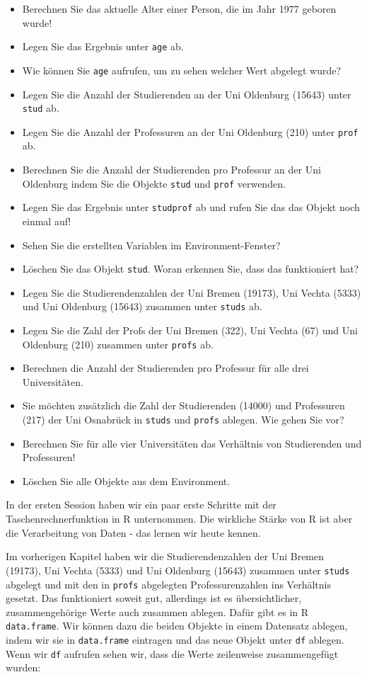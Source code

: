 \documentclass[
  letterpaper,
  DIV=11,
  numbers=noendperiod]{scrreprt}
\begin{document}
\begin{itemize}
\item
  Berechnen Sie das aktuelle Alter einer Person, die im Jahr 1977
  geboren wurde!
\item
  Legen Sie das Ergebnis unter \texttt{age} ab.
\item
  Wie können Sie \texttt{age} aufrufen, um zu sehen welcher Wert
  abgelegt wurde?
\item
  Legen Sie die Anzahl der Studierenden an der Uni Oldenburg (15643)
  unter \texttt{stud} ab.
\item
  Legen Sie die Anzahl der Professuren an der Uni Oldenburg (210) unter
  \texttt{prof} ab.
\item
  Berechnen Sie die Anzahl der Studierenden pro Professur an der Uni
  Oldenburg indem Sie die Objekte \texttt{stud} und \texttt{prof}
  verwenden.
\item
  Legen Sie das Ergebnis unter \texttt{studprof} ab und rufen Sie das
  das Objekt noch einmal auf!
\item
  Sehen Sie die erstellten Variablen im Environment-Fenster?
\item
  Löschen Sie das Objekt \texttt{stud}. Woran erkennen Sie, dass das
  funktioniert hat?
\item
  Legen Sie die Studierendenzahlen der Uni Bremen (19173), Uni Vechta
  (5333) und Uni Oldenburg (15643) zusammen unter \texttt{studs} ab.
\item
  Legen Sie die Zahl der Profs der Uni Bremen (322), Uni Vechta (67) und
  Uni Oldenburg (210) zusammen unter \texttt{profs} ab.
\item
  Berechnen die Anzahl der Studierenden pro Professur für alle drei
  Universitäten.
\item
  Sie möchten zusätzlich die Zahl der Studierenden (14000) und
  Professuren (217) der Uni Osnabrück in \texttt{studs} und
  \texttt{profs} ablegen. Wie gehen Sie vor?
\item
  Berechnen Sie für alle vier Universitäten das Verhältnis von
  Studierenden und Professuren!
\item
  Löschen Sie alle Objekte aus dem Environment.
\end{itemize}

In der ersten Session haben wir ein paar erste Schritte mit der
Taschenrechnerfunktion in R unternommen. Die wirkliche Stärke von R ist
aber die Verarbeitung von Daten - das lernen wir heute kennen.

Im vorherigen Kapitel haben wir die Studierendenzahlen der Uni Bremen
(19173), Uni Vechta (5333) und Uni Oldenburg (15643) zusammen unter
\texttt{studs} abgelegt und mit den in \texttt{profs} abgelegten
Professurenzahlen ins Verhältnis gesetzt. Das funktioniert soweit gut,
allerdings ist es übersichtlicher, zusammengehörige Werte auch zusammen
ablegen. Dafür gibt es in R \texttt{data.frame}. Wir können dazu die
beiden Objekte in einem Datensatz ablegen, indem wir sie in
\texttt{data.frame} eintragen und das neue Objekt unter \texttt{df}
ablegen. Wenn wir \texttt{df} aufrufen sehen wir, dass die Werte
zeilenweise zusammengefügt wurden:
\end{document}
